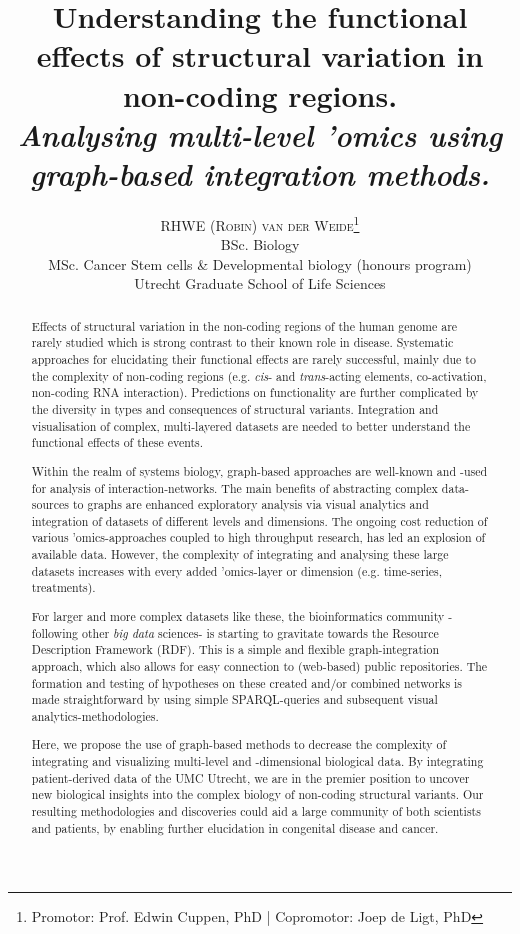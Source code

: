 \documentclass[twoside,fontsize=12pt]{article}
\title{\vspace{-15mm}\fontsize{18pt}{10pt}\normalfont\textbf{Understanding the functional effects of structural variation in non-coding regions.\\ \vspace{4 mm} {{\footnotesize \textit{Analysing multi-level 'omics using graph-based integration methods.}}}}} %
\author{
\large
\textsc {RHWE (Robin) van der Weide}\thanks{Promotor: Prof. Edwin Cuppen, PhD | Copromotor: Joep de Ligt, PhD}\\[2mm] 
\normalsize  BSc. Biology\\
\normalsize  MSc. Cancer Stem cells \& Developmental biology (honours program)\\
\normalsize  Utrecht Graduate School of Life Sciences \\
\vspace{-5mm}
}
\date{}
\renewcommand{\abstractname}{}    %
\begin{document}
\maketitle %
\thispagestyle{fancy} %

\newpage
\renewcommand{\abstractname}{\begin{center}
Summary of the research
\end{center}}    %

\begin{abstract}
\noindent
Effects of structural variation in the non-coding regions of the human genome are rarely studied which is strong contrast to their known role in disease\cite{Weischenfeldt2013}. Systematic approaches for elucidating their functional effects are rarely successful, mainly due to the complexity of non-coding regions (e.g. \textit{cis}- and \textit{trans}-acting elements, co-activation, non-coding RNA interaction). Predictions on functionality are further complicated by the diversity in types and consequences of structural variants. Integration and visualisation of complex, multi-layered datasets are needed to better understand the functional effects of these events\cite{Munoz2011}.
\medskip

\noindent 
Within the realm of systems biology, graph-based approaches are well-known and -used for analysis of interaction-networks. The main benefits of abstracting complex data-sources to graphs are enhanced exploratory analysis via visual analytics and integration of datasets of different levels and dimensions. The ongoing cost reduction of various 'omics-approaches coupled to high throughput research, has led an explosion of available data. However, the complexity of integrating and analysing these large datasets increases with every added 'omics-layer or dimension (e.g. time-series, treatments). 

For larger and more complex datasets like these, the bioinformatics community -following other \textit{big data} sciences- is starting to gravitate towards the Resource Description Framework (RDF). This is a simple and flexible graph-integration approach, which also allows for easy connection to (web-based) public repositories. The formation and testing of hypotheses on these created and/or combined networks is made straightforward by using simple SPARQL-queries and subsequent visual analytics-methodologies.
\medskip

\noindent Here, we propose the use of graph-based methods to decrease the complexity of integrating and visualizing multi-level and -dimensional biological data. By integrating patient-derived data of the UMC Utrecht, we are in the premier position to uncover new biological insights into the complex biology of non-coding structural variants. Our resulting methodologies and discoveries could aid a large community of both scientists and patients, by enabling further elucidation in congenital disease and cancer. 
\end{abstract}
\medskip
\end{document}
